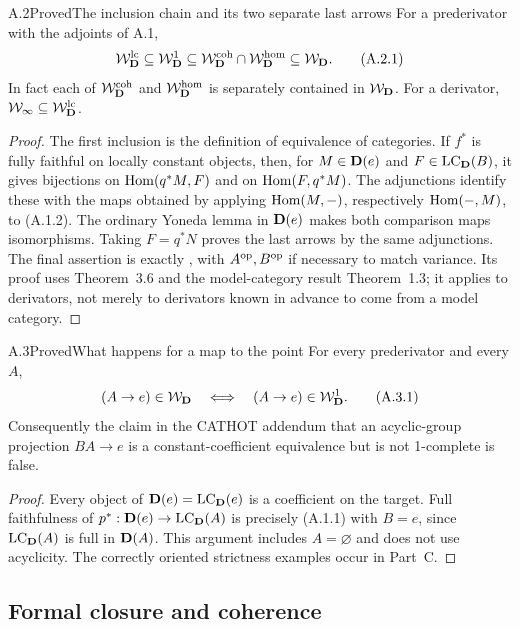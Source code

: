 \begin{claim}{A.2}{Proved}{The inclusion chain and its two separate last arrows}
For a prederivator with the adjoints of A.1,
\[
 \mathcal W_{\mathbf D}^{\mathrm{lc}}\subseteq\mathcal W_{\mathbf D}^{1}\subseteq
 \mathcal W_{\mathbf D}^{\mathrm{coh}}\cap\mathcal W_{\mathbf D}^{\mathrm{hom}}\subseteq\mathcal W_{\mathbf D}.
 \tag{A.2.1}
\]
In fact each of $\mathcal W_{\mathbf D}^{\mathrm{coh}}$ and $\mathcal W_{\mathbf D}^{\mathrm{hom}}$ is separately contained in
$\mathcal W_{\mathbf D}$. For a derivator,
$\mathcal W_{\infty}\subseteq\mathcal W_{\mathbf D}^{\mathrm{lc}}$.
\end{claim}
\begin{proof}
The first inclusion is the definition of equivalence of categories.
If $f^*$ is fully faithful on locally constant objects, then, for
$M\in\mathbf D(e)$ and $F\in\operatorname{LC}_\mathbf D(B)$, it gives bijections on
$\operatorname{Hom}(q^*M,F)$ and on $\operatorname{Hom}(F,q^*M)$. The adjunctions identify these
with the maps obtained by applying $\operatorname{Hom}(M,-)$, respectively
$\operatorname{Hom}(-,M)$, to (A.1.2). The ordinary Yoneda lemma in $\mathbf D(e)$ makes
both comparison maps isomorphisms. Taking $F=q^*N$ proves the last
arrows by the same adjunctions. The final assertion is exactly
\citet[Corollary~3.8]{Cisinski2009LocallyConstant}, with $A^{\mathrm{op}},B^{\mathrm{op}}$ if
necessary to match variance. Its proof uses Theorem~3.6 and the
model-category result Theorem~1.3; it applies to derivators, not merely
to derivators known in advance to come from a model category.
\end{proof}

\begin{claim}{A.3}{Proved}{What happens for a map to the point}
For every prederivator and every $A$,
\[
 (A\to e)\in\mathcal W_{\mathbf D}\quad\Longleftrightarrow\quad
 (A\to e)\in\mathcal W_{\mathbf D}^{1}.
 \tag{A.3.1}
\]
Consequently the claim in the CATHOT addendum that an acyclic-group
projection $BA\to e$ is a constant-coefficient equivalence but is not
1-complete is false.
\end{claim}
\begin{proof}
Every object of $\mathbf D(e)=\operatorname{LC}_\mathbf D(e)$ is a coefficient on the target.
Full faithfulness of $p^*:\mathbf D(e)\to\operatorname{LC}_\mathbf D(A)$ is precisely
(A.1.1) with $B=e$, since $\operatorname{LC}_\mathbf D(A)$ is full in $\mathbf D(A)$.
This argument includes $A=\varnothing$ and does not use acyclicity.
The correctly oriented strictness examples occur in Part~C.
\end{proof}

\subsection{Formal closure and coherence}

